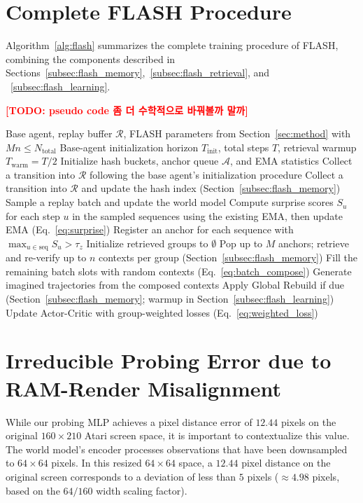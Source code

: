 \documentclass{article} %
\newcommand{\todo}[1]{\textcolor{red}{\textbf{[TODO: #1]}}}
\begin{document}
\section{Complete FLASH Procedure}
\label{app:flash_algorithm}

Algorithm~\ref{alg:flash} summarizes the complete training procedure of FLASH,
combining the components described in Sections~\ref{subsec:flash_memory},~\ref{subsec:flash_retrieval}, and ~\ref{subsec:flash_learning}.


\todo{pseudo code 좀 더 수학적으로 바꿔볼까 말까}

\begin{algorithm}[t]
\caption{FLASH: Fast Latent Anchor Search with Hashing}
\label{alg:flash}
\begin{algorithmic}[1]
\REQUIRE Base agent, replay buffer $\mathcal{R}$, FLASH parameters from Section~\ref{sec:method} with $Mn \leq N_{\text{total}}$
\REQUIRE Base-agent initialization horizon $T_{\text{init}}$, total steps $T$, retrieval warmup $T_{\text{warm}} = T/2$
\STATE Initialize hash buckets, anchor queue $\mathcal{A}$, and EMA statistics
    \STATE Collect a transition into $\mathcal{R}$ following the base agent's initialization procedure
\ENDFOR
{}
    \STATE Collect a transition into $\mathcal{R}$ and update the hash index (Section~\ref{subsec:flash_memory})
    \STATE Sample a replay batch and update the world model
    \STATE Compute surprise scores $S_u$ for each step $u$ in the sampled sequences using the existing EMA, then update EMA (Eq.~\ref{eq:surprise})
        \STATE Register an anchor for each sequence with $\max_{u \in \mathrm{seq}} S_u > \tau_z$
    \ENDIF
    \STATE Initialize retrieved groups to $\emptyset$
        \STATE Pop up to $M$ anchors; retrieve and re-verify up to $n$ contexts per group (Section~\ref{subsec:flash_memory})
    \ENDIF
    \STATE Fill the remaining batch slots with random contexts (Eq.~\eqref{eq:batch_compose})
    \STATE Generate imagined trajectories from the composed contexts
    \STATE Apply Global Rebuild if due (Section~\ref{subsec:flash_memory}; warmup in Section~\ref{subsec:flash_learning})
    \STATE Update Actor-Critic with group-weighted losses (Eq.~\eqref{eq:weighted_loss})
\ENDFOR
\end{algorithmic}
\end{algorithm}

\section{Irreducible Probing Error due to RAM-Render Misalignment}
\label{sec:appendix_ram_misalignment}
While our probing MLP achieves a pixel distance error of $12.44$ pixels on the original $160 \times 210$ Atari screen space, it is important to contextualize this value. The world model's encoder processes observations that have been downsampled to $64 \times 64$ pixels. In this resized $64 \times 64$ space, a $12.44$ pixel distance on the original screen corresponds to a deviation of less than $5$ pixels ($\approx 4.98$ pixels, based on the $64/160$ width scaling factor). 
\end{document}
